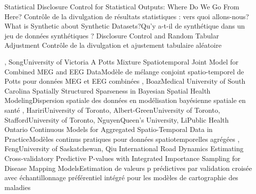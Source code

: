 
{
}
{ Statistical Disclosure Control for Statistical Outputs: Where Do We Go From Here? }{ Contrôle de la divulgation de résultats statistiques : vers quoi allons-nous? }
{\bubbleE \enspace \screenE}
{
}
{What is Synthetic about Synthetic Datasets?}{Qu’y a-t-il de synthétique dans un jeu de données synthétiques ?}
{\bubbleE \enspace \screenE}
{
}
{Disclosure Control and Random Tabular Adjustment }{Contrôle de la divulgation et ajustement tabulaire aléatoire}
{\bubbleE \enspace \screenE}


{
,  {Song}{University of Victoria}
}
{A Potts Mixture Spatiotemporal Joint Model for Combined MEG and EEG Data}{Modèle de mélange conjoint spatio-temporel de Potts pour données MEG et EEG combinées}
{\bubbleE \enspace \screenE}
{
,  {Boaz}{Medical University of South Carolina}
}
{Spatially Structured Sparseness in Bayesian Spatial Health Modeling}{Dispersion spatiale des données en modélisation bayésienne spatiale en santé}
{\bubbleE \enspace \screenE}
{
,  {Hariri}{University of Toronto},  {Albert-Green}{University of Toronto},  {Stafford}{University of Toronto},  {Nguyen}{Queen's University},  {Li}{Public Health Ontario}
}
{Continuous Models for Aggregated Spatio-Temporal Data in Practice}{Modèles continus pratiques pour données spatiotemporelles agrégées}
{\bubbleE \enspace \screenE}
{
,  {Feng}{University of Saskatchewan},  {Qiu} {International Road Dynamics}
}
{Estimating Cross-validatory Predictive P-values with Integrated Importance Sampling for Disease Mapping Models}{Estimation de valeurs p prédictives par validation croisée avec échantillonnage préférentiel intégré pour les modèles de cartographie des maladies}
{\bubbleE \enspace \screenE}

